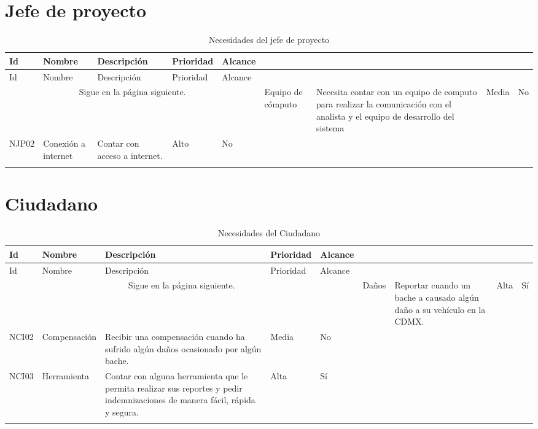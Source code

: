 \section {Jefe de proyecto}
\begin{longtable}{|m{1.5cm}|m{3cm}|m{5cm}|m{2cm}| m{2cm}|}\rowcolor[HTML]{3531FF} 
        {\color[HTML]{FFFFFF} Id} &{\color[HTML]{FFFFFF}Nombre} & {\color[HTML]{FFFFFF} Descripción} & {\color[HTML]{FFFFFF}Prioridad} & {\color[HTML]{FFFFFF}Alcance}\\
        \hline
        \endfirsthead
        \hline
        Id & Nombre & Descripción & Prioridad & Alcance  \\
        \hline 
        \endhead
        \multicolumn{5}{c}{Sigue en la página siguiente.}
        \endfoot
        \endlastfoot
        
        NJP01 & Equipo de cómputo & Necesita contar con un equipo de computo para realizar la comunicación con el analista y el equipo de desarrollo del sistema & Media & No \\
        \hline
        NJP02 & Conexión a internet & Contar con acceso a internet. & Alto & No \\ \hline
    \caption{Necesidades del jefe de proyecto}
    \label{tab:NJPs}
\end{longtable}

\section {Ciudadano} 
\begin{longtable}{|m{1.5cm}|m{3cm}|m{5cm}|m{2cm}| m{2cm}|}\rowcolor[HTML]{3531FF} 
        {\color[HTML]{FFFFFF} Id} &{\color[HTML]{FFFFFF}Nombre} & {\color[HTML]{FFFFFF} Descripción} & {\color[HTML]{FFFFFF}Prioridad} & {\color[HTML]{FFFFFF}Alcance}\\
        \hline
        \endfirsthead
        \hline
        {\color[HTML]{FFFFFF} Id} &{\color[HTML]{FFFFFF}Nombre} & {\color[HTML]{FFFFFF} Descripción} & {\color[HTML]{FFFFFF}Prioridad} & {\color[HTML]{FFFFFF}Alcance}\\
        \hline 
        \endhead
        \multicolumn{5}{c}{Sigue en la página siguiente.}
        \endfoot
        \endlastfoot
        NCI01 &  Daños & Reportar cuando un bache a causado algún daño a su vehículo en la CDMX. & Alta & Sí \\ \hline
        NCI02 & Compensación & Recibir una compensación cuando ha sufrido algún daños ocasionado por algún bache. & Media & No \\\hline
        NCI03 &  Herramienta & Contar con alguna herramienta que le permita realizar sus reportes y pedir indemnizaciones de manera fácil, rápida y segura. & Alta & Sí \\
      \hline
    \caption{Necesidades del Ciudadano}
    \label{tab:NCIs}
\end{longtable}


